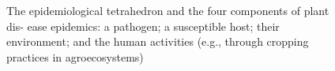 \begin{figure}
\label{fig:distriangle}
\caption{The epidemiological tetrahedron and the four components of plant dis- ease epidemics: a pathogen; a susceptible host; their environment; and the human activities (e.g., through cropping practices in agroecosystems)}


\end{figure}